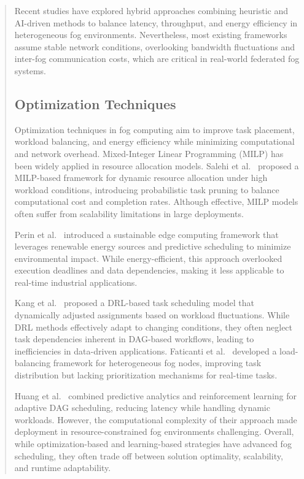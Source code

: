 \documentclass[conference]{IEEEtran}
\begin{document}
\begin{abstract}
Recent studies have explored hybrid approaches combining heuristic and AI-driven methods to balance latency, throughput, and energy efficiency in heterogeneous fog environments. Nevertheless, most existing frameworks assume stable network conditions, overlooking bandwidth fluctuations and inter-fog communication costs, which are critical in real-world federated fog systems.

\subsection{Optimization Techniques}

Optimization techniques in fog computing aim to improve task placement, workload balancing, and energy efficiency while minimizing computational and network overhead. Mixed-Integer Linear Programming (MILP) has been widely applied in resource allocation models. Salehi et al.~\cite{Salehi2016} proposed a MILP-based framework for dynamic resource allocation under high workload conditions, introducing probabilistic task pruning to balance computational cost and completion rates. Although effective, MILP models often suffer from scalability limitations in large deployments.

Perin et al.~\cite{perin2022sustainable} introduced a sustainable edge computing framework that leverages renewable energy sources and predictive scheduling to minimize environmental impact. While energy-efficient, this approach overlooked execution deadlines and data dependencies, making it less applicable to real-time industrial applications.

Kang et al.~\cite{kang2021adaptive} proposed a DRL-based task scheduling model that dynamically adjusted assignments based on workload fluctuations. While DRL methods effectively adapt to changing conditions, they often neglect task dependencies inherent in DAG-based workflows, leading to inefficiencies in data-driven applications. Faticanti et al.~\cite{faticanti2020load} developed a load-balancing framework for heterogeneous fog nodes, improving task distribution but lacking prioritization mechanisms for real-time tasks.

Huang et al.~\cite{huang2022adaptive} combined predictive analytics and reinforcement learning for adaptive DAG scheduling, reducing latency while handling dynamic workloads. However, the computational complexity of their approach made deployment in resource-constrained fog environments challenging. Overall, while optimization-based and learning-based strategies have advanced fog scheduling, they often trade off between solution optimality, scalability, and runtime adaptability.


\end{abstract}
\end{document}
